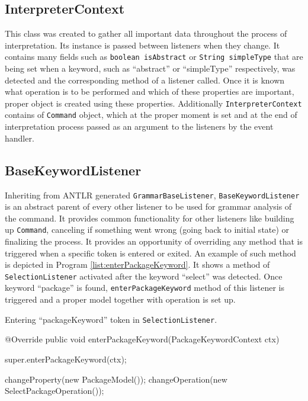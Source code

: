 \subsection{InterpreterContext}
This class was created to gather all important data throughout the process of interpretation. Its instance is passed between listeners when they change. It contains many fields such as \texttt{boolean isAbstract} or \texttt{String simpleType} that are being set when a keyword, such as ``abstract'' or ``simpleType'' respectively, was detected and the corresponding method of a listener called. Once it is known what operation is to be performed and which of these properties are important, proper object is created using these properties. Additionally \texttt{InterpreterContext} contains of \texttt{Command} object, which at the proper moment is set and at the end of interpretation process passed as an argument to the listeners by the event handler.

\subsection{BaseKeywordListener}
Inheriting from ANTLR generated \texttt{GrammarBaseListener}, \texttt{BaseKeywordListener} is an abstract parent of every other listener to be used for grammar analysis of the command. It provides common functionality for other listeners like building up \texttt{Command}, canceling if something went wrong (going back to initial state) or finalizing the process. It provides an opportunity of overriding any method that is triggered when a specific token is entered or exited. An example of such method is depicted in Program \ref{list:enterPackageKeyword}. It shows a method of \texttt{SelectionListener} activated after the keyword ``select'' was detected. Once keyword ``package'' is found, \texttt{enterPackageKeyword} method of this listener is triggered and a proper model together with operation is set up.

\begin{program}[hbt!]
    \caption{Entering ``packageKeyword'' token in \texttt{SelectionListener}.}
    \label{list:enterPackageKeyword}
    \begin{JavaCode}
@Override
	public void enterPackageKeyword(PackageKeywordContext ctx) {
		super.enterPackageKeyword(ctx);

		changeProperty(new PackageModel());
		changeOperation(new SelectPackageOperation());
	}    \end{JavaCode}
\end{program}

